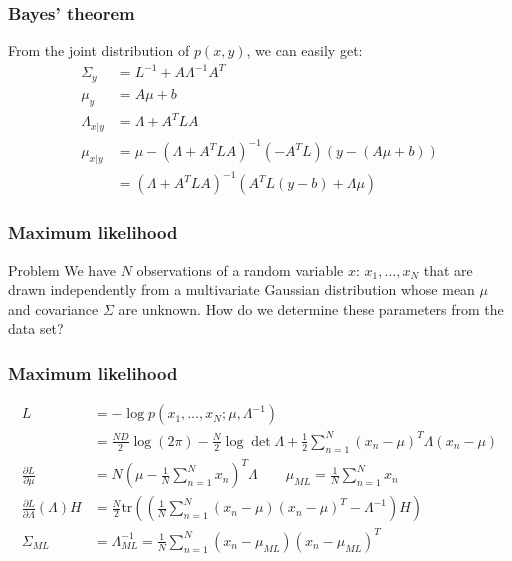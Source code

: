 \documentclass{beamer}
\begin{document}
\begin{frame}
    \frametitle{Bayes' theorem}
    From the joint distribution of $p(x,y)$, we can easily get:
    \begin{align*}
        \Sigma_{y}&=L^{-1}+A\Lambda^{-1}A^{T} \\
        \mu_{y}&=A\mu+b \\
        \Lambda_{x|y}&=\Lambda+A^{T}LA \\
        \mu_{x|y}&=\mu-(\Lambda+A^{T}LA)^{-1}(-A^{T}L)(y-(A\mu+b)) \\
        &=(\Lambda+A^{T}LA)^{-1}(A^{T}L(y-b)+\Lambda\mu)
    \end{align*}
\end{frame}

\begin{frame}
    \frametitle{Maximum likelihood}
    \begin{block}{Problem}
        We have $N$ observations of a random variable $x$: $x_{1},\hdots,x_{N}$ that are drawn independently from a multivariate Gaussian distribution whose mean $\mu$ and covariance $\Sigma$ are unknown. How do we determine these parameters from the data set?
    \end{block}
\end{frame}

\begin{frame}
    \frametitle{Maximum likelihood}
    \begin{align*}
        L&=-\log{}p(x_{1},\hdots,x_{N};\mu,\Lambda^{-1}) \\
        &=\frac{ND}{2}\log(2\pi)-\frac{N}{2}\log\det\Lambda+\frac{1}{2}\sum_{n=1}^{N}(x_{n}-\mu)^{T}\Lambda(x_{n}-\mu) \\
        \frac{\partial{}L}{\partial\mu}&=N(\mu-\frac{1}{N}\sum_{n=1}^{N}x_{n})^{T}\Lambda\qquad\mu_{ML}=\frac{1}{N}\sum_{n=1}^{N}x_{n} \\
        \frac{\partial{}L}{\partial\Lambda}(\Lambda)H&=\frac{N}{2}\mathrm{tr}((\frac{1}{N}\sum_{n=1}^{N}(x_{n}-\mu)(x_{n}-\mu)^{T}-\Lambda^{-1})H) \\
        \Sigma_{ML}&=\Lambda^{-1}_{ML}=\frac{1}{N}\sum_{n=1}^{N}(x_{n}-\mu_{ML})(x_{n}-\mu_{ML})^{T}
    \end{align*}
\end{frame}
\end{document}
